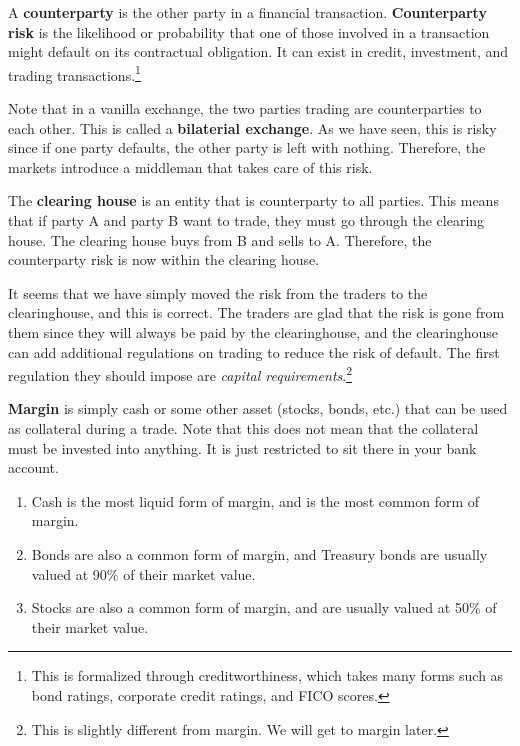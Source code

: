 \documentclass{article}
\begin{document}
    \begin{definition}[Counterparty]
      A \textbf{counterparty} is the other party in a financial transaction. \textbf{Counterparty risk} is the likelihood or probability that one of those involved in a transaction might default on its contractual obligation. It can exist in credit, investment, and trading transactions.\footnote{This is formalized through creditworthiness, which takes many forms such as bond ratings, corporate credit ratings, and FICO scores.}
    \end{definition}

    Note that in a vanilla exchange, the two parties trading are counterparties to each other. This is called a \textbf{bilaterial exchange}. As we have seen, this is risky since if one party defaults, the other party is left with nothing. Therefore, the markets introduce a middleman that takes care of this risk. 

    \begin{definition}
      The \textbf{clearing house} is an entity that is counterparty to all parties. This means that if party A and party B want to trade, they must go through the clearing house. The clearing house buys from B and sells to A. Therefore, the counterparty risk is now within the clearing house.
    \end{definition}

    It seems that we have simply moved the risk from the traders to the clearinghouse, and this is correct. The traders are glad that the risk is gone from them since they will always be paid by the clearinghouse, and the clearinghouse can add additional regulations on trading to reduce the risk of default. The first regulation they should impose are \textit{capital requirements}.\footnote{This is slightly different from margin. We will get to margin later. } 

    \begin{definition}[Capital]
      \textbf{Margin} is simply cash or some other asset (stocks, bonds, etc.) that can be used as collateral during a trade. Note that this does not mean that the collateral must be invested into anything. It is just restricted to sit there in your bank account. 
      \begin{enumerate}
        \item Cash is the most liquid form of margin, and is the most common form of margin. 
        \item Bonds are also a common form of margin, and Treasury bonds are usually valued at 90\% of their market value.
        \item Stocks are also a common form of margin, and are usually valued at 50\% of their market value. 
      \end{enumerate}
    \end{definition}
\end{document}
